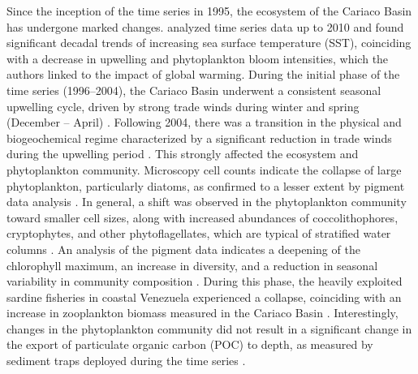 \documentclass[draft]{agujournal2019}
\begin{document}
    Since the inception of the time series in 1995, the ecosystem of the Cariaco Basin has undergone marked changes.  analyzed time series data up to 2010 and found significant decadal trends of increasing sea surface temperature (SST), coinciding with a decrease in upwelling and phytoplankton bloom intensities, which the authors linked to the impact of global warming. During the initial phase of the time series (1996–2004), the Cariaco Basin underwent a consistent seasonal upwelling cycle, driven by strong trade winds during winter and spring (December – April) \cite{mullerkarger_annual_2001, astor_seasonal_2003}. Following 2004, there was a transition in the physical and biogeochemical regime characterized by a significant reduction in trade winds during the upwelling period \cite{taylor_ecosystem_2012}. This strongly affected the ecosystem and phytoplankton community. Microscopy cell counts indicate the collapse of large phytoplankton, particularly diatoms, as confirmed to a lesser extent by pigment data analysis \cite{pinckney_phytoplankton_2015}. In general, a shift was observed in the phytoplankton community toward smaller cell sizes, along with increased abundances of coccolithophores, cryptophytes, and other phytoflagellates, which are typical of stratified water columns \cite{lorenzoni_characterization_2015}. An analysis of the pigment data indicates a deepening of the chlorophyll maximum, an increase in diversity, and a reduction in seasonal variability in community composition \cite{pinckney_phytoplankton_2015}. During this phase, the heavily exploited sardine fisheries in coastal Venezuela experienced a collapse, coinciding with an increase in zooplankton biomass measured in the Cariaco Basin \cite{taylor_ecosystem_2012}. Interestingly, changes in the phytoplankton community did not result in a significant change in the export of particulate organic carbon (POC) to depth, as measured by sediment traps deployed during the time series \cite{pinckney_phytoplankton_2015}.
\end{document}
